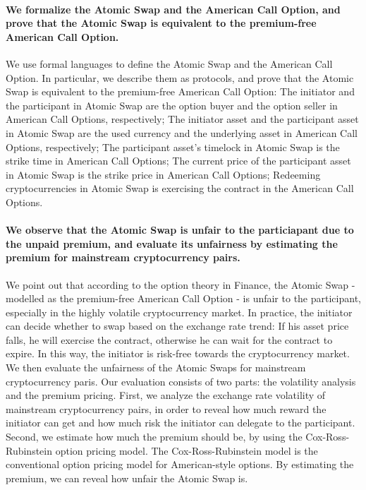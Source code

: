 \paragraph{We formalize the Atomic Swap and the American Call Option, and prove that the Atomic Swap is equivalent to the premium-free American Call Option.}
We use formal languages to define the Atomic Swap and the American Call Option.
In particular, we describe them as protocols, and prove that the Atomic Swap is equivalent to the premium-free American Call Option:
The initiator and the participant in Atomic Swap are the option buyer and the option seller in American Call Options, respectively;
The initiator asset and the participant asset in Atomic Swap are the used currency and the underlying asset in American Call Options, respectively;
The participant asset's timelock in Atomic Swap is the strike time in American Call Options;
The current price of the participant asset in Atomic Swap is the strike price in American Call Options;
Redeeming cryptocurrencies in Atomic Swap is exercising the contract in the American Call Options.

\paragraph{We observe that the Atomic Swap is unfair to the particiapant due to the unpaid premium, and evaluate its unfairness by estimating the premium for mainstream cryptocurrency pairs.}
We point out that according to the option theory in Finance, the Atomic Swap - modelled as the premium-free American Call Option - is unfair to the participant, especially in the highly volatile cryptocurrency market.
In practice, the initiator can decide whether to swap based on the exchange rate trend: If his asset price falls, he will exercise the contract, otherwise he can wait for the contract to expire.
In this way, the initiator is risk-free towards the cryptocurrency market. 
We then evaluate the unfairness of the Atomic Swaps for mainstream cryptocurrency paris.
Our evaluation consists of two parts: the volatility analysis and the premium pricing.
First, we analyze the exchange rate volatility of mainstream cryptocurrency pairs, in order to reveal how much reward the initiator can get and how much risk the initiator can delegate to the participant.
Second, we estimate how much the premium should be, by using the Cox-Ross-Rubinstein option pricing model.
The Cox-Ross-Rubinstein model is the conventional option pricing model for American-style options.
By estimating the premium, we can reveal how unfair the Atomic Swap is.

